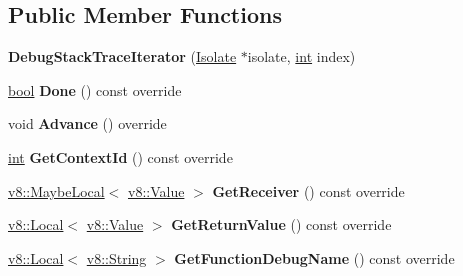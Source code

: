 \subsection*{Public Member Functions}
\begin{DoxyCompactItemize}
\item 
\mbox{\label{classv8_1_1internal_1_1DebugStackTraceIterator_aa2dc40140d458c2797fc9307ed5fde4c}} 
{\bfseries Debug\+Stack\+Trace\+Iterator} (\mbox{\hyperlink{classv8_1_1internal_1_1Isolate}{Isolate}} $\ast$isolate, \mbox{\hyperlink{classint}{int}} index)
\item 
\mbox{\label{classv8_1_1internal_1_1DebugStackTraceIterator_a74130e4c88da07cd0d52fe4a33387c69}} 
\mbox{\hyperlink{classbool}{bool}} {\bfseries Done} () const override
\item 
\mbox{\label{classv8_1_1internal_1_1DebugStackTraceIterator_aa32813e6280c059b2a0e1fc98c61c938}} 
void {\bfseries Advance} () override
\item 
\mbox{\label{classv8_1_1internal_1_1DebugStackTraceIterator_aa13295a74d8372446d0853ae22e5f30c}} 
\mbox{\hyperlink{classint}{int}} {\bfseries Get\+Context\+Id} () const override
\item 
\mbox{\label{classv8_1_1internal_1_1DebugStackTraceIterator_a495ce0f852497dd8364c48ec377bf2b3}} 
\mbox{\hyperlink{classv8_1_1MaybeLocal}{v8\+::\+Maybe\+Local}}$<$ \mbox{\hyperlink{classv8_1_1Value}{v8\+::\+Value}} $>$ {\bfseries Get\+Receiver} () const override
\item 
\mbox{\label{classv8_1_1internal_1_1DebugStackTraceIterator_a645b1519631eedbb98f316be88fab64e}} 
\mbox{\hyperlink{classv8_1_1Local}{v8\+::\+Local}}$<$ \mbox{\hyperlink{classv8_1_1Value}{v8\+::\+Value}} $>$ {\bfseries Get\+Return\+Value} () const override
\item 
\mbox{\label{classv8_1_1internal_1_1DebugStackTraceIterator_abe3c5921ed9268c0b90755a92af81161}} 
\mbox{\hyperlink{classv8_1_1Local}{v8\+::\+Local}}$<$ \mbox{\hyperlink{classv8_1_1String}{v8\+::\+String}} $>$ {\bfseries Get\+Function\+Debug\+Name} () const override

\end{DoxyCompactItemize}
